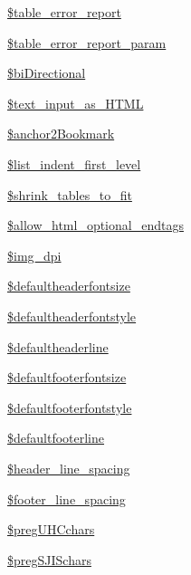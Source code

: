 \begin{DoxyCompactItemize}
\item 
\hyperlink{classm_p_d_f_a2777710f7d2c724ee1ae8575a82528ce}{\$table\-\_\-error\-\_\-report}
\item 
\hyperlink{classm_p_d_f_abfb3be2ce3f90e1b9052ea2ffc28930e}{\$table\-\_\-error\-\_\-report\-\_\-param}
\item 
\hyperlink{classm_p_d_f_a284238da0bc140f84b5b72acad0e0897}{\$bi\-Directional}
\item 
\hyperlink{classm_p_d_f_a44d56f9feb36ac4aef2af4fe59cc09d8}{\$text\-\_\-input\-\_\-as\-\_\-\-H\-T\-M\-L}
\item 
\hyperlink{classm_p_d_f_a446ef93bac1a003b22cd8a480733b8eb}{\$anchor2\-Bookmark}
\item 
\hyperlink{classm_p_d_f_a4573d20171953e9686ea3e7d961594ab}{\$list\-\_\-indent\-\_\-first\-\_\-level}
\item 
\hyperlink{classm_p_d_f_a356132539fd1c9e5c98f7c89b3c5ccbb}{\$shrink\-\_\-tables\-\_\-to\-\_\-fit}
\item 
\hyperlink{classm_p_d_f_a961f0e4ee9725232a52cb5b38efffc02}{\$allow\-\_\-html\-\_\-optional\-\_\-endtags}
\item 
\hyperlink{classm_p_d_f_ab85189b139766f6ff6571e80397338dd}{\$img\-\_\-dpi}
\item 
\hyperlink{classm_p_d_f_af2f12b6b0fbf931fcb057e48ce7f873a}{\$defaultheaderfontsize}
\item 
\hyperlink{classm_p_d_f_a19fc36fef79cbc8a4f3c210519e9ec28}{\$defaultheaderfontstyle}
\item 
\hyperlink{classm_p_d_f_a479a24db329cf97be8b1b6fb2127298e}{\$defaultheaderline}
\item 
\hyperlink{classm_p_d_f_a99aac9194b80ff9e4bb53b867775f917}{\$defaultfooterfontsize}
\item 
\hyperlink{classm_p_d_f_a767e9801cebfe76eeec56d23ff494436}{\$defaultfooterfontstyle}
\item 
\hyperlink{classm_p_d_f_ae03f4fb84dc29e831e3ea606fcf2db34}{\$defaultfooterline}
\item 
\hyperlink{classm_p_d_f_a4693ddf6c24da0122a7b065282360a7e}{\$header\-\_\-line\-\_\-spacing}
\item 
\hyperlink{classm_p_d_f_a60a5cc605138f8bd010b806b6f42a307}{\$footer\-\_\-line\-\_\-spacing}
\item 
\hyperlink{classm_p_d_f_aa659fcd1b4db599dc78c61040c9238fc}{\$preg\-U\-H\-Cchars}
\item 
\hyperlink{classm_p_d_f_a7024f5d39fcb8c5826431b7fc96177ca}{\$preg\-S\-J\-I\-Schars}
\item 

\end{DoxyCompactItemize}
